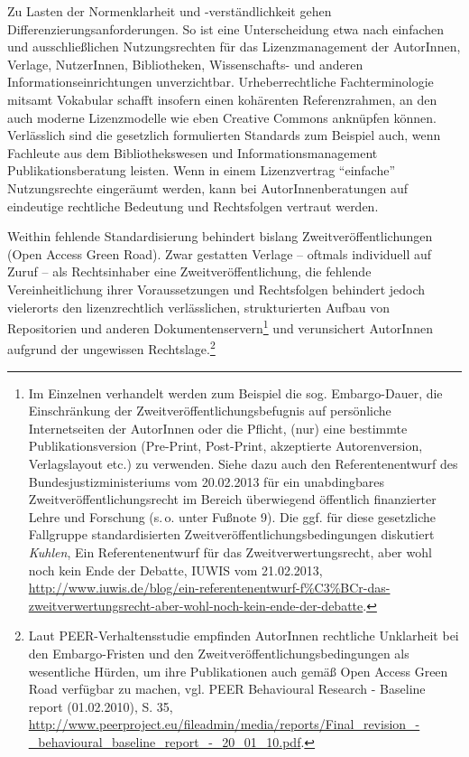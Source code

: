 \documentclass[output=paper]{langscibook}
\begin{document}
Zu Lasten der Normenklarheit und -verständlichkeit gehen
Differenzierungsanforderungen. So ist eine Unterscheidung etwa nach
einfachen und ausschließlichen Nutzungsrechten für das Lizenzmanagement
der AutorInnen, Verlage, NutzerInnen, Bibliotheken, Wissenschafts- und
anderen Informationseinrichtungen unverzichtbar. Urheberrechtliche
Fachterminologie mitsamt Vokabular schafft insofern einen kohärenten
Referenzrahmen, an den auch moderne Lizenzmodelle wie eben Creative
Commons anknüpfen können. Verlässlich sind die gesetzlich formulierten
Standards zum Beispiel auch, wenn Fachleute aus dem Bibliothekswesen und
Informationsmanagement Publikationsberatung leisten. Wenn in einem
Lizenzvertrag \enquote{einfache} Nutzungsrechte eingeräumt werden, kann
bei AutorInnenberatungen auf eindeutige rechtliche Bedeutung und
Rechtsfolgen vertraut werden.

Weithin fehlende Standardisierung behindert bislang
Zweitveröffentlichungen (Open Access Green Road). Zwar gestatten Verlage
-- oftmals individuell auf Zuruf -- als Rechtsinhaber eine
Zweitveröffentlichung, die fehlende Vereinheitlichung ihrer
Voraussetzungen und Rechtsfolgen behindert jedoch vielerorts den
lizenzrechtlich verlässlichen, strukturierten Aufbau von Repositorien
und anderen Dokumentenservern\footnote{Im Einzelnen verhandelt werden
  zum Beispiel die sog. Embargo-Dauer, die Einschränkung der
  Zweitveröffentlichungsbefugnis auf persönliche Internetseiten der
  AutorInnen oder die Pflicht, (nur) eine bestimmte Publikationsversion
  (Pre-Print, Post-Print, akzeptierte Autorenversion, Verlagslayout
  etc.) zu verwenden. Siehe dazu auch den Referentenentwurf des
  Bundesjustizministeriums vom 20.02.2013 für ein unabdingbares
  Zweitveröffentlichungsrecht im Bereich überwiegend öffentlich
  finanzierter Lehre und Forschung (s.\,o. unter Fußnote 9). Die ggf. für
  diese gesetzliche Fallgruppe standardisierten
  Zweitveröffentlichungsbedingungen diskutiert \emph{Kuhlen}, Ein
  Referentenentwurf für das Zweitverwertungsrecht, aber wohl noch kein
  Ende der Debatte, IUWIS vom 21.02.2013,
  \url{http://www.iuwis.de/blog/ein-referentenentwurf-f\%C3\%BCr-das-zweitverwertungsrecht-aber-wohl-noch-kein-ende-der-debatte}.}
und verunsichert AutorInnen aufgrund der ungewissen
Rechtslage.\footnote{Laut PEER-Verhaltensstudie empfinden AutorInnen
  rechtliche Unklarheit bei den Embargo-Fristen und den
  Zweitveröffentlichungsbedingungen als wesentliche Hürden, um ihre
  Publikationen auch gemäß Open Access Green Road verfügbar zu machen,
  vgl. PEER Behavioural Research - Baseline report (01.02.2010), S. 35,
  \url{http://www.peerproject.eu/fileadmin/media/reports/Final_revision_-_behavioural_baseline_report_-_20_01_10.pdf}.}
\end{document}
